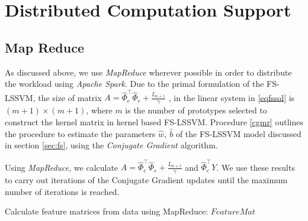\chapter{Distributed Computation Support}
\label{cha:3}

\section*{Map Reduce}

As discussed above, we use \textit{MapReduce} wherever possible in order to distribute the workload using \textit{Apache Spark}. Due to the primal formulation of the FS-LSSVM, the size of matrix $A =  \hat{\Phi}^{\intercal}_e \hat{\Phi}_e + \frac{\mathit{I}_{m+1}}{\gamma}$ , in the linear system in \eqref{eqfssol} is $(m+1) \times (m+1)$, where $m$ is the number of prototypes selected to construct the kernel matrix in kernel based FS-LSSVM. Procedure \ref{cgmr} outlines the procedure to estimate the parameters $\hat{w},\ \hat{b}$ of the FS-LSSVM model discussed in section \ref{sec:fs}, using the \textit{Conjugate Gradient} algorithm. 

Using \textit{MapReduce}, we calculate $A = \hat{\Phi}^{\intercal}_e \hat{\Phi}_e + \frac{\mathit{I}_{m+1}}{\gamma}$ and $\hat{\Phi}^{\intercal}_e Y$. We use these results to carry out iterations of the Conjugate Gradient updates until the maximum number of iterations is reached.

\begin{algorithm}[t]\label{fmmr}
    \DontPrintSemicolon
\caption{Calculate feature matrices from data using MapReduce: $FeatureMat$}
\end{algorithm}


